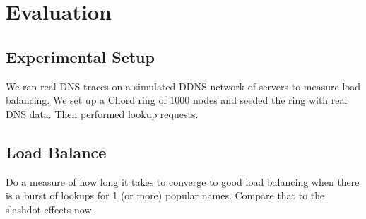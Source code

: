 \section{Evaluation}

\subsection{Experimental Setup}

We ran real DNS traces on a simulated DDNS network
of servers to measure load balancing. We set up a
Chord ring of 1000 nodes and seeded the ring with 
real DNS data. Then performed lookup requests.

\subsection{Load Balance}


Do a measure of how long it takes to converge to good load 
balancing when there is a burst of lookups for 1 (or more)
popular names. Compare that to the slashdot effects now.




